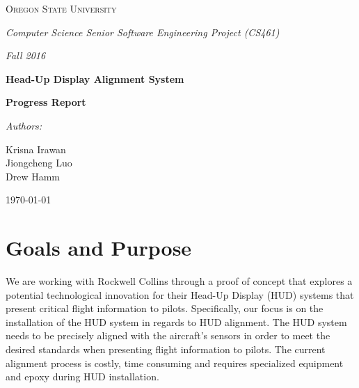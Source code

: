 \documentclass[letterpaper,10pt,onecolumn]{IEEEtran}
\def\name{Krisna Irawan\\ Jiongcheng Luo\\ Drew Hamm}
\def\doc{Progress Report}
\begin{document}
\begin{titlepage}
	\centering
	{\scshape\LARGE Oregon State University \par}
	\vspace{2cm}
	{\Large\itshape Computer Science Senior Software Engineering Project (CS461)\par}
	{\Large\itshape Fall 2016\par}
	\vspace{1cm}
	{\huge\bfseries Head-Up Display Alignment System\par}
	\vspace{5mm}
	{\huge\bfseries \doc\par}
	\vspace{2cm}
	{\large\itshape Authors:\par}
	{\large \name\par}
	\vspace{5cm}


	\begin{abstract}
	A Head-up Display (HUD), is a transparent display that presents all necessary data that pilots need in their flight environment. This project is a proof concept to explore a potential technological innovation for  HUD system that present critical flight information to pilots. The primary objective of this project is to reduce the cost and time required to precisely align flight information to the HUD by introducing additional sensor to the system to make the alignment process more dynamic. The product being developed is a demonstration system that looks to include a MEMS IRU mounted onto the HUD and a new alignment algorithm that utilizes this additional sensor to determine accurate HUD alignment. This document will cover the progress that we made since the beginning of the term. In this document we include the project goal, purpose, where we are currently, some codes that we have been working on, and the retrospective of the past ten weeks. 
	\end{abstract}
	\vfill
	{\normalsize \today\par}
\end{titlepage}


\section{Goals and Purpose}
We are working with Rockwell Collins through a proof of concept that explores a potential technological innovation for their Head-Up Display (HUD) systems that present critical flight information to pilots. Specifically, our focus is on the installation of the HUD system in regards to HUD alignment. The HUD system needs to be precisely aligned with the aircraft's sensors in order to meet the desired standards when presenting flight information to pilots. The current alignment process is costly, time consuming and requires specialized equipment and epoxy during HUD installation. 
\end{document}
